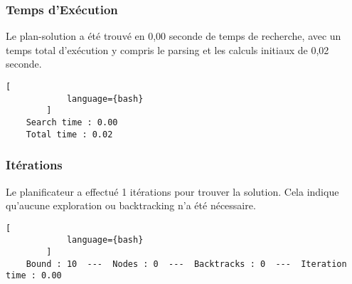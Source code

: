 \documentclass[../CSC_5RO16_TA_TP5.tex]{subfiles}
\begin{document}
\subsubsection{Temps d'Exécution}
\begin{resolution}
    Le plan-solution a été trouvé en 0,00 seconde de temps de recherche, avec un temps total d'exécution y compris le parsing et les calculs initiaux de 0,02 seconde.

    \begin{scriptsize}\mycode
        \begin{lstlisting}[
            language={bash}
        ]
    Search time : 0.00
    Total time : 0.02
        \end{lstlisting}
    \end{scriptsize}
\end{resolution}

\subsubsection{Itérations}
\begin{resolution}
    Le planificateur a effectué 1 itérations pour trouver la solution. Cela indique qu'aucune exploration ou backtracking n'a été nécessaire.

    \begin{scriptsize}\mycode
        \begin{lstlisting}[
            language={bash}
        ]
    Bound : 10  ---  Nodes : 0  ---  Backtracks : 0  ---  Iteration time : 0.00
        \end{lstlisting}
    \end{scriptsize}
\end{resolution}
\end{document}
